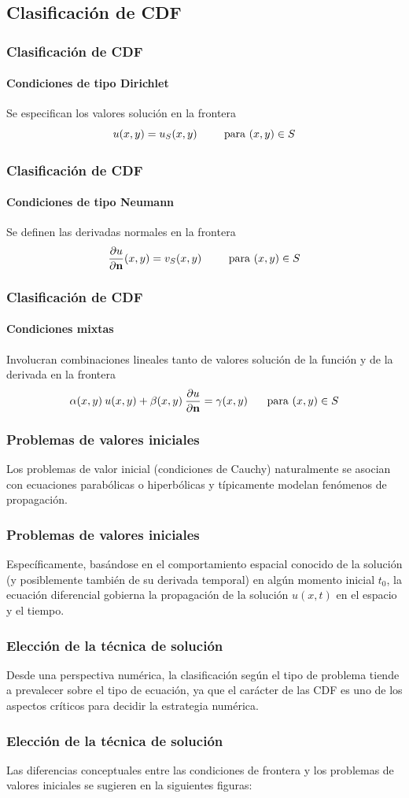 \subsection{Clasificación de CDF}
\begin{frame}
\frametitle{Clasificación de CDF}
\framesubtitle{Condiciones de tipo Dirichlet}
Se especifican los valores solución en la frontera
\[ u(x, y) = u_{S}(x, y) \hspace{0.75cm} \mbox{ para } (x, y) \in S \]
\end{frame}
\begin{frame}
\frametitle{Clasificación de CDF}
\framesubtitle{Condiciones de tipo Neumann}
Se definen las derivadas normales en la frontera
\[ \dfrac{\partial u}{\partial \mathbf{n}} (x, y) = v_{S}(x, y) \hspace{0.75cm} \mbox{ para } (x, y) \in S \]
\end{frame}
\begin{frame}
\frametitle{Clasificación de CDF}
\framesubtitle{Condiciones mixtas}
Involucran combinaciones lineales tanto de valores solución de la función y de la derivada en la frontera
\[ \alpha(x, y) \: u(x, y) + \beta(x, y) \: \dfrac{\partial u}{\partial \mathbf{n}} = \gamma(x, y) \hspace{0.5cm} \mbox{ para } (x, y) \in S \]
\end{frame}
\begin{frame}
\frametitle{Problemas de valores iniciales}
Los problemas de valor inicial (condiciones de Cauchy) naturalmente se asocian con ecuaciones parabólicas o hiperbólicas y típicamente modelan fenómenos de propagación.
\end{frame}
\begin{frame}
\frametitle{Problemas de valores iniciales}
Específicamente, basándose en el comportamiento espacial conocido de la solución (y posiblemente también de su derivada temporal) en algún momento inicial $t_{0}$, la ecuación diferencial gobierna la propagación de la solución $u(x, t)$ en el espacio y el tiempo.
\end{frame}
\begin{frame}
\frametitle{Elección de la técnica de solución}
Desde una perspectiva numérica, la clasificación según el tipo de problema tiende a prevalecer sobre el tipo de ecuación, ya que el carácter de las CDF es uno de los aspectos críticos para decidir la estrategia numérica.
\end{frame}
\begin{frame}
\frametitle{Elección de la técnica de solución}
Las diferencias conceptuales entre las condiciones de frontera y los problemas de valores iniciales se sugieren en la siguientes figuras:
\end{frame}
